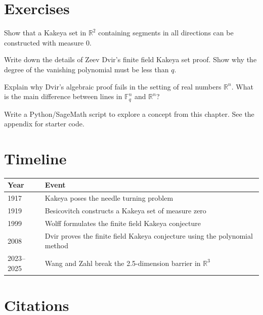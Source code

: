 \section{Exercises}

\begin{exercise}[Basic]
Show that a Kakeya set in $\mathbb{R}^2$ containing segments in all directions can be constructed with measure 0.
\end{exercise}

\begin{exercise}[Intermediate]
Write down the details of Zeev Dvir's finite field Kakeya set proof. Show why the degree of the vanishing polynomial must be less than $q$.
\end{exercise}

\begin{exercise}[Challenge]
Explain why Dvir's algebraic proof fails in the setting of real numbers $\mathbb{R}^n$. What is the main difference between lines in $\mathbb{F}_q^n$ and $\mathbb{R}^n$?
\end{exercise}

\begin{exercise}[Computational]
Write a Python/SageMath script to explore a concept from this chapter. See the appendix for starter code.
\end{exercise}

\section{Timeline}

\begin{tabularx}{\linewidth}{lX}
\toprule
\textbf{Year} & \textbf{Event} \\ \midrule
1917 & Kakeya poses the needle turning problem \cite{kakeya1917} \\ 
1919 & Besicovitch constructs a Kakeya set of measure zero \cite{besicovitch1919} \\ 
1999 & Wolff formulates the finite field Kakeya conjecture \cite{wolff1999} \\ 
2008 & Dvir proves the finite field Kakeya conjecture using the polynomial method \cite{dvir2009} \\ 
2023--2025 & Wang and Zahl break the 2.5-dimension barrier in $\mathbb{R}^3$ \cite{wangzahl2024} \\ \bottomrule
\end{tabularx}

\section{Citations}

